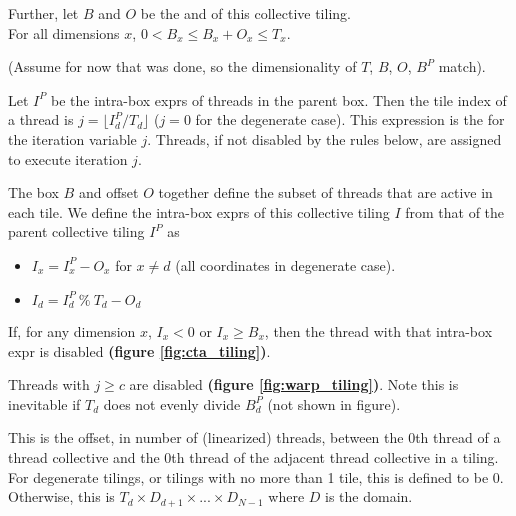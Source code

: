 \filbreak
Further, let $B$ and $O$ be the  and  of this collective tiling.\\
For all dimensions $x$, $0 < B_x \le B_x + O_x \le T_x$.

\filbreak
(Assume for now that  was done, so the dimensionality of $T$, $B$, $O$, $B^P$ match).

\filbreak
{} Let $I^P$ be the intra-box exprs of threads in the parent box.
Then the tile index of a thread is $j = \lfloor I^P_d / T_d \rfloor$ ($j = 0$ for the degenerate case).
This expression is the  for the iteration variable $j$.
Threads, if not disabled by the rules below, are assigned to execute iteration $j$.

\filbreak
{} The box $B$ and offset $O$ together define the subset of threads that are active in each tile.
We define the intra-box exprs of this collective tiling $I$ from that of the parent collective tiling $I^P$ as
\begin{itemize}
  \item $I_x = I^P_x - O_x$ for $x \ne d$ (all coordinates in degenerate case).
  \item $I_d = I^P_d~\%~T_d - O_d$
\end{itemize}
If, for any dimension $x$, $I_x < 0$ or $I_x \ge B_x$, then the thread with that intra-box expr is disabled
\textbf{(figure \ref{fig:cta_tiling})}.

\filbreak
{} Threads with $j \ge c$ are disabled \textbf{(figure \ref{fig:warp_tiling})}.
Note this is inevitable if $T_d$ does not evenly divide $B^P_d$ (not shown in figure).

\filbreak
{} This is the offset, in number of (linearized) threads, between the 0th thread of a thread collective and the 0th thread of the adjacent thread collective in a tiling.
For degenerate tilings, or tilings with no more than 1 tile, this is defined to be 0.
Otherwise, this is $T_d \times D_{d+1} \times ... \times D_{N-1}$ where $D$ is the domain.

